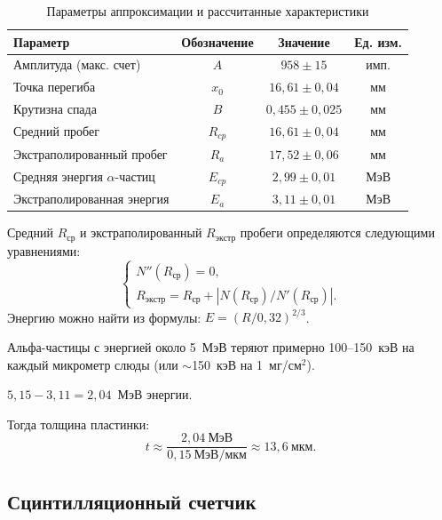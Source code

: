 \documentclass[a4paper]{article}
\begin{document}
\begin{table}[h]
\centering
\caption{Параметры аппроксимации и рассчитанные характеристики}
\begin{tabular}{|l|c|c|c|}
\hline
\textbf{Параметр} & \textbf{Обозначение} & \textbf{Значение} & \textbf{Ед. изм.} \\ \hline
Амплитуда (макс. счет) & \(A\) & \(958 \pm 15\) & имп. \\ \hline
Точка перегиба & \(x_0\) & \(16,61 \pm 0,04\) & мм \\ \hline
Крутизна спада & \(B\) & \(0,455 \pm 0,025\) & мм \\ \hline
Средний пробег & \(R_{cp}\) & \(16,61 \pm 0,04\) & мм \\ \hline
Экстраполированный пробег & \(R_a\) & \(17,52 \pm 0,06\) & мм \\ \hline
Средняя энергия \(\alpha\)-частиц & \(E_{cp}\) & \(2,99 \pm 0,01\) & МэВ \\ \hline
Экстраполированная энергия & \(E_a\) & \(3,11 \pm 0,01\) & МэВ \\ \hline
\end{tabular}
\end{table}

Средний $R_{\mathrm{ср}}$ и экстраполированный $R_{\mathrm{экстр}}$ пробеги определяются следующими уравнениями:
\[
\begin{cases}
N''(R_{\mathrm{ср}}) = 0, \\[8pt]
R_{\mathrm{экстр}} = R_{\mathrm{ср}} + \left| N(R_{\mathrm{ср}}) / N'(R_{\mathrm{ср}}) \right|.
\end{cases}
\]
Энергию можно найти из формулы: $E = (R/0{,}32)^{2/3}$.

Альфа-частицы с энергией около 5~МэВ теряют примерно 100--150~кэВ на каждый микрометр слюды (или $\sim$150~кэВ на 1~мг/см${}^2$).

$5{,}15 - 3{,}11 = 2{,}04$~МэВ энергии.


Тогда толщина пластинки:
\[
t \approx \frac{2{,}04~\text{МэВ}}{0{,}15~\text{МэВ}/\text{мкм}} \approx 13{,}6~\text{мкм}.
\]

\subsection{Сцинтилляционный счетчик}
\end{document}
